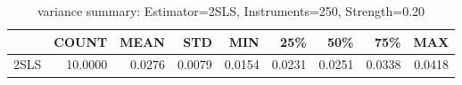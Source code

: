 \begin{table}[ht]
\centering
\caption{variance summary: Estimator=2SLS, Instruments=250, Strength=0.20}
\begin{tabular}{lrrrrrrrr}
\toprule
 & COUNT & MEAN & STD & MIN & 25\% & 50\% & 75\% & MAX \\
\midrule
2SLS & 10.0000 & 0.0276 & 0.0079 & 0.0154 & 0.0231 & 0.0251 & 0.0338 & 0.0418 \\
\bottomrule
\end{tabular}
\end{table}
